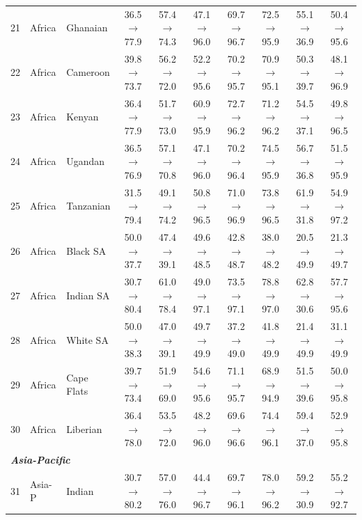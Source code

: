 \begin{table}[t]
{\begin{tabular}{rll c c c c c c c}
21 & Africa & Ghanaian & 36.5$\rightarrow$77.9 & 57.4$\rightarrow$74.3 & 47.1$\rightarrow$96.0 & 69.7$\rightarrow$96.7 & 72.5$\rightarrow$95.9 & 55.1$\rightarrow$36.9 & 50.4$\rightarrow$95.6 \\
22 & Africa & Cameroon & 39.8$\rightarrow$73.7 & 56.2$\rightarrow$72.0 & 52.2$\rightarrow$95.6 & 70.2$\rightarrow$95.7 & 70.9$\rightarrow$95.1 & 50.3$\rightarrow$39.7 & 48.1$\rightarrow$96.9 \\
23 & Africa & Kenyan & 36.4$\rightarrow$77.9 & 51.7$\rightarrow$73.0 & 60.9$\rightarrow$95.9 & 72.7$\rightarrow$96.2 & 71.2$\rightarrow$96.2 & 54.5$\rightarrow$37.1 & 49.8$\rightarrow$96.5 \\
24 & Africa & Ugandan & 36.5$\rightarrow$76.9 & 57.1$\rightarrow$70.8 & 47.1$\rightarrow$96.0 & 70.2$\rightarrow$96.4 & 74.5$\rightarrow$95.9 & 56.7$\rightarrow$36.8 & 51.5$\rightarrow$95.9 \\
25 & Africa & Tanzanian & 31.5$\rightarrow$79.4 & 49.1$\rightarrow$74.2 & 50.8$\rightarrow$96.5 & 71.0$\rightarrow$96.9 & 73.8$\rightarrow$96.5 & 61.9$\rightarrow$31.8 & 54.9$\rightarrow$97.2 \\
26 & Africa & Black SA & 50.0$\rightarrow$37.7 & 47.4$\rightarrow$39.1 & 49.6$\rightarrow$48.5 & 42.8$\rightarrow$48.7 & 38.0$\rightarrow$48.2 & 20.5$\rightarrow$49.9 & 21.3$\rightarrow$49.7 \\
27 & Africa & Indian SA & 30.7$\rightarrow$80.4 & 61.0$\rightarrow$78.4 & 49.0$\rightarrow$97.1 & 73.5$\rightarrow$97.1 & 78.8$\rightarrow$97.0 & 62.8$\rightarrow$30.6 & 57.7$\rightarrow$95.6 \\
28 & Africa & White SA & 50.0$\rightarrow$38.3 & 47.0$\rightarrow$39.1 & 49.7$\rightarrow$49.9 & 37.2$\rightarrow$49.0 & 41.8$\rightarrow$49.9 & 21.4$\rightarrow$49.9 & 31.1$\rightarrow$49.9 \\
29 & Africa & Cape Flats & 39.7$\rightarrow$73.4 & 51.9$\rightarrow$69.0 & 54.6$\rightarrow$95.6 & 71.1$\rightarrow$95.7 & 68.9$\rightarrow$94.9 & 51.5$\rightarrow$39.6 & 50.0$\rightarrow$95.8 \\
30 & Africa & Liberian & 36.4$\rightarrow$78.0 & 53.5$\rightarrow$72.0 & 48.2$\rightarrow$96.0 & 69.6$\rightarrow$96.6 & 74.4$\rightarrow$96.1 & 59.4$\rightarrow$37.0 & 52.9$\rightarrow$95.8 \\
\midrule
\multicolumn{10}{l}{\textit{\textbf{Asia-Pacific}}} \\
31 & Asia-P & Indian & 30.7$\rightarrow$80.2 & 57.0$\rightarrow$76.0 & 44.4$\rightarrow$96.7 & 69.7$\rightarrow$96.1 & 78.0$\rightarrow$96.2 & 59.2$\rightarrow$30.9 & 55.2$\rightarrow$92.7 \\

\end{tabular}}
\end{table}
